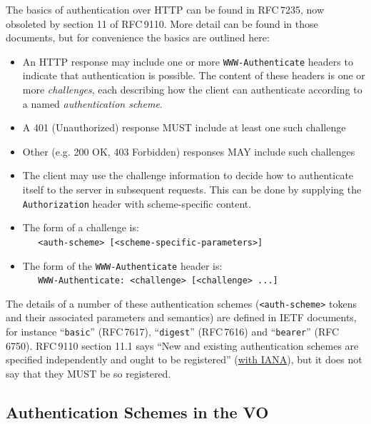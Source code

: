 \documentclass[11pt,a4paper]{ivoa}
\newcommand{\rfc}[1]{RFC\,#1}
\newcommand{\header}[1]{{\tt #1}}
\begin{document}
The basics of authentication over HTTP can be found in \rfc{7235},
now obsoleted by section 11 of \rfc{9110}.
More detail can be found in those documents, but for convenience
the basics are outlined here:
\begin{itemize}
  \item An HTTP response may include one or more 
        \header{WWW-Authenticate} headers
        to indicate that authentication is possible.
        The content of these headers is one or more {\em challenges},
        each describing how the client can authenticate according
        to a named {\em authentication scheme}.
  \item A 401 (Unauthorized) response MUST include at least one such challenge
  \item Other (e.g. 200 OK, 403 Forbidden) responses
        MAY include such challenges
  \item The client may use the challenge information to decide how
        to authenticate itself to the server in subsequent requests.
        This can be done by supplying the \header{Authorization} header
        with scheme-specific content.
  \item The form of a challenge is:\\
        \verb|   <auth-scheme> [<scheme-specific-parameters>]|
  \item The form of the \header{WWW-Authenticate} header is:\\
        \verb|   WWW-Authenticate: <challenge> [<challenge> ...]|
\end{itemize}


The details of a number of these authentication schemes
(\verb|<auth-scheme>| tokens and their associated parameters and semantics)
are defined in IETF documents, for instance
``{\tt basic}'' (\rfc{7617}),
``{\tt digest}'' (\rfc{7616})
and
``{\tt bearer}'' (\rfc{6750}).
\rfc{9110} section 11.1 says
``New and existing authentication schemes are
  specified independently and ought to be registered''
  (\href{https://www.iana.org/assignments/http-authschemes}{with IANA}),
but it does not say that they MUST be so registered.



\subsection{Authentication Schemes in the VO}
\end{document}
